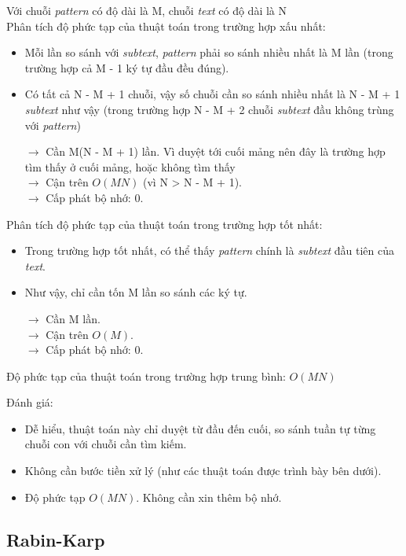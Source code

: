 \documentclass[a4paper,11pt]{article}
\begin{document}
		Với chuỗi \textit{pattern} có độ dài là M, chuỗi \textit{text} có độ dài là N \\
		Phân tích độ phức tạp của thuật toán trong trường hợp xấu nhất:
		\begin{itemize}
			\item Mỗi lần so sánh với \textit{subtext}, \textit{pattern} phải so sánh nhiều nhất là M lần (trong trường hợp cả M - 1 ký tự đầu đều đúng).
			\item Có tất cả N - M + 1 chuỗi, vậy số chuỗi cần so sánh nhiều nhất là N - M + 1 \textit{subtext} như vậy (trong trường hợp N - M + 2 chuỗi \textit{subtext} đầu không trùng với \textit{pattern})
			
			$\to$ Cần M(N - M + 1) lần. Vì duyệt tới cuối mảng nên đây là trường hợp tìm thấy ở cuối mảng, hoặc không tìm thấy\\
			$\to$ Cận trên $O(MN)$ (vì N > N - M + 1). \\
			$\to$ Cấp phát bộ nhớ: 0.
		\end{itemize}

		Phân tích độ phức tạp của thuật toán trong trường hợp tốt nhất:
		\begin{itemize}
			\item Trong trường hợp tốt nhất, có thể thấy \textit{pattern} chính là \textit{subtext} đầu tiên của \textit{text}.
			\item Như vậy, chỉ cần tốn M lần so sánh các ký tự.
			
			$\to$ Cần M lần. \\
			$\to$ Cận trên $O(M)$. \\
			$\to$ Cấp phát bộ nhớ: 0.
		\end{itemize}

		Độ phức tạp của thuật toán trong trường hợp trung bình: $O(MN)$
		
		Đánh giá:
		\begin{itemize}
			\item Dễ hiểu, thuật toán này chỉ duyệt từ đầu đến cuối, so sánh tuần tự từng chuỗi con với chuỗi cần tìm kiếm.
			\item Không cần bước tiền xử lý (như các thuật toán được trình bày bên dưới).
			\item Độ phức tạp $O(MN)$. Không cần xin thêm bộ nhớ.
		\end{itemize}

		\subsection {Rabin-Karp}
		
\end{document}
